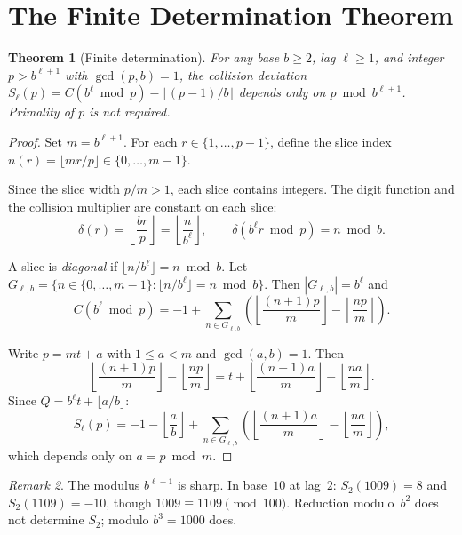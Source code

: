 \documentclass[12pt]{amsart}
\newtheorem{theorem}{Theorem}
\theoremstyle{definition}
\theoremstyle{remark}
\newtheorem{remark}[theorem]{Remark}
\begin{document}
\section{The Finite Determination Theorem}

\begin{theorem}[Finite determination]\label{thm:finite}
For any base $b \ge 2$, lag $\ell \ge 1$, and integer
$p > b^{\ell+1}$ with $\gcd(p, b) = 1$, the collision
deviation $S_{\ell}(p) = C(b^{\ell} \bmod p) - \lfloor
(p{-}1)/b \rfloor$ depends only on $p \bmod b^{\ell+1}$.
Primality of $p$ is not required.
\end{theorem}

\begin{proof}
Set $m = b^{\ell+1}$. For each $r \in \{1, \ldots, p{-}1\}$,
define the slice index $n(r) = \lfloor mr/p \rfloor
\in \{0, \ldots, m{-}1\}$.

Since the slice width $p/m > 1$, each slice contains integers.
The digit function and the collision multiplier are constant on
each slice:
\[
\delta(r) = \left\lfloor \frac{br}{p} \right\rfloor
= \left\lfloor \frac{n}{b^{\ell}} \right\rfloor,
\qquad
\delta(b^{\ell} r \bmod p) = n \bmod b.
\]

A slice is \emph{diagonal} if
$\lfloor n/b^{\ell} \rfloor = n \bmod b$. Let
$G_{\ell,b} = \{n \in \{0, \ldots, m{-}1\} :
\lfloor n/b^{\ell} \rfloor = n \bmod b\}$.
Then $|G_{\ell,b}| = b^{\ell}$ and
\[
C(b^{\ell} \bmod p) = -1 + \sum_{n \in G_{\ell,b}}
\left(
\left\lfloor \frac{(n{+}1)p}{m} \right\rfloor
- \left\lfloor \frac{np}{m} \right\rfloor
\right).
\]

Write $p = mt + a$ with $1 \le a < m$ and $\gcd(a, b) = 1$.
Then
\[
\left\lfloor \frac{(n{+}1)p}{m} \right\rfloor
- \left\lfloor \frac{np}{m} \right\rfloor
= t + \left\lfloor \frac{(n{+}1)a}{m} \right\rfloor
- \left\lfloor \frac{na}{m} \right\rfloor.
\]
Since $Q = b^{\ell} t + \lfloor a/b \rfloor$:
\[
S_{\ell}(p) = -1 - \left\lfloor \frac{a}{b} \right\rfloor
+ \sum_{n \in G_{\ell,b}}
\left(
\left\lfloor \frac{(n{+}1)a}{m} \right\rfloor
- \left\lfloor \frac{na}{m} \right\rfloor
\right),
\]
which depends only on $a = p \bmod m$.
\end{proof}

\begin{remark}
The modulus $b^{\ell+1}$ is sharp. In base~$10$ at lag~$2$:
$S_2(1009) = 8$ and $S_2(1109) = -10$, though
$1009 \equiv 1109 \pmod{100}$. Reduction modulo~$b^2$ does
not determine $S_2$; modulo $b^3 = 1000$ does.
\end{remark}
\end{document}
